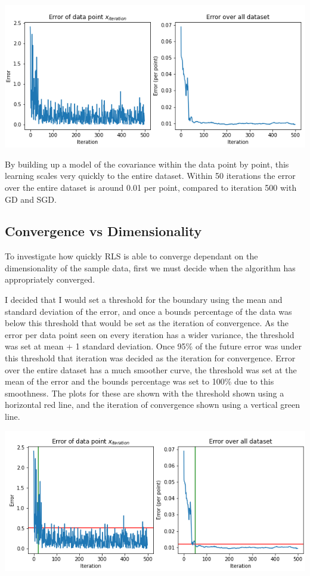 \documentclass[sigconf]{acmart}
\begin{document}
\begin{center}
    \includegraphics[width=\linewidth]{figs/RLS Error of points.png}
\end{center}
By building up a model of the covariance within the data point by point, this learning scales very quickly to the entire dataset. Within 50 iterations the error over the entire dataset is around 0.01 per point, compared to iteration 500 with GD and SGD.
\subsection{Convergence vs Dimensionality}
To investigate how quickly RLS is able to converge dependant on the dimensionality of the sample data, first we must decide when the algorithm has appropriately converged.

I decided that I would set a threshold for the boundary using the mean and standard deviation of the error, and once a bounds percentage of the data was below this threshold that would be set as the iteration of convergence.
As the error per data point seen on every iteration has a wider variance, the threshold was set at mean + 1 standard deviation. Once 95\% of the future error was under this threshold that iteration was decided as the iteration for convergence.
Error over the entire dataset has a much smoother curve, the threshold was set at the mean of the error and the bounds percentage was set to 100\% due to this smoothness. 
The plots for these are shown with the threshold shown using a horizontal red line, and the iteration of convergence shown using a vertical green line. 

\begin{center}
    \includegraphics[width=\linewidth]{figs/RLS Error W Lines.png}
\end{center}
\end{document}
